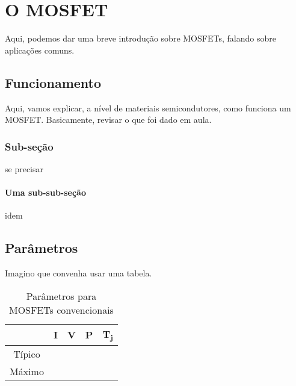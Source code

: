 \documentclass[
	portugues %
]{./ppgccufmg}
\begin{document}
	
	\chapter{O MOSFET}
		Aqui, podemos dar uma breve introdução sobre MOSFETs, falando sobre aplicações comuns.
		
		\section{Funcionamento}
			Aqui, vamos explicar, a nível de materiais semicondutores, como funciona um MOSFET. Basicamente, revisar o que foi dado em aula.
			   
			\subsection{Sub-seção}
			se precisar
				\subsubsection{Uma sub-sub-seção}
					idem

		\section{Parâmetros}
			Imagino que convenha usar uma tabela.

			\begin{table}[ht]
				\centering
				\begin{tabular}{|c|c|c|c|c|}
				\hline
								& I & V & P & T\textsubscript{j} \\ \hline
				Típico	&   &   &   &										 \\ \hline
				Máximo	&   &   &   &										 \\ \hline
				\end{tabular}
				\caption{Parâmetros para MOSFETs convencionais}
				\label{tab:mosfet_convencional_param}
			\end{table}
\end{document}
